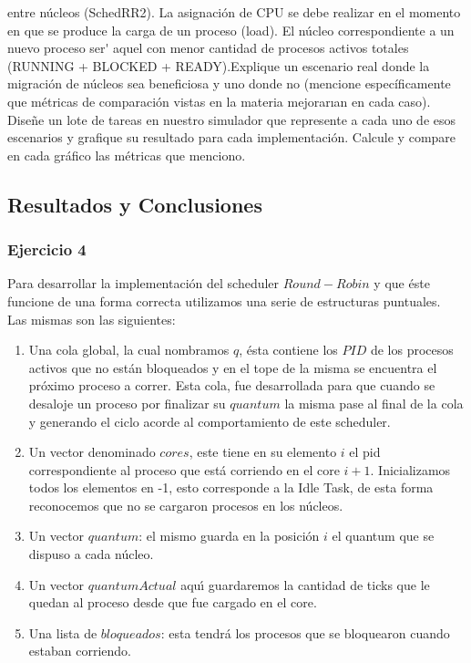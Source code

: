 \begin{itemize}
entre n\'{u}cleos (SchedRR2). La asignación de CPU se debe realizar en el momento en que se produce la carga 
de un proceso (load). El n\'{u}cleo correspondiente a un nuevo proceso ser\'{} aquel
con menor cantidad de procesos activos totales (RUNNING + BLOCKED + READY).Explique un escenario real 
donde la migraci\'{o}n de n\'{u}cleos sea beneficiosa y uno donde no (mencione
espec\'{i}ficamente que m\'{e}tricas de comparaci\'{o}n vistas en la materia mejorarıan en cada caso).
Dise\~{n}e un lote de tareas en nuestro simulador que represente a cada uno de esos escenarios
y grafique su resultado para cada implementaci\'{o}n. Calcule y compare en cada gr\'{a}fico las
m\'{e}tricas que menciono.

\end{itemize}


\subsection{Resultados y Conclusiones}

\subsubsection[Resolución Ejercicio 4]{Ejercicio 4}
Para desarrollar la implementación del scheduler $Round-Robin$ y que \'{e}ste funcione de una forma correcta
utilizamos una serie de estructuras puntuales. \\
Las mismas son las siguientes:\\
\begin{enumerate}
 \item Una cola global, la cual nombramos $q$, \'{e}sta contiene los $PID$ de los procesos activos que no est\'{a}n
 bloqueados y en el tope de la misma se encuentra el próximo proceso a correr. Esta cola,
 fue desarrollada para que cuando se desaloje un proceso por finalizar su $quantum$ la misma pase al final de
 la cola y generando el ciclo acorde al comportamiento de este scheduler.
 \item Un vector denominado $cores$, este tiene en su elemento $i$ el pid correspondiente 
 al proceso que está corriendo en el core $i+1$. Inicializamos todos los elementos en -1, esto
corresponde a la Idle Task, de esta forma reconocemos que no se cargaron procesos en los núcleos.
\item Un vector $quantum$: el mismo guarda en la posici\'on $i$ el quantum que se dispuso a cada núcleo.
\item Un vector $quantumActual$ aqu\'{\i} guardaremos la cantidad de ticks que le quedan al proceso
desde que fue cargado en el core.
\item Una lista de $bloqueados$: esta tendr\'{a} los procesos que se bloquearon cuando estaban corriendo.
\end{enumerate}

